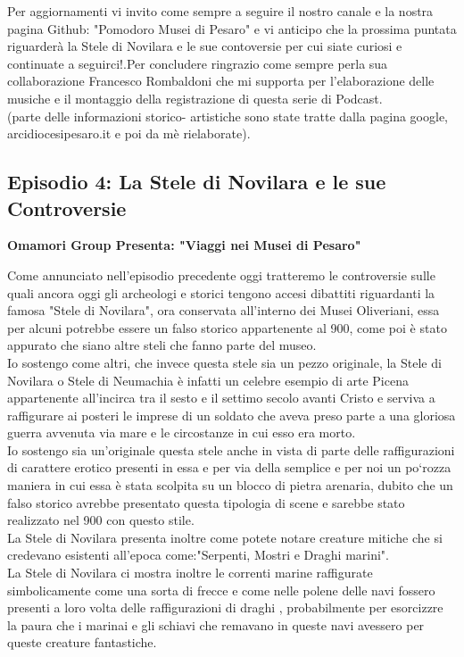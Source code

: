\documentclass[hidelinks,12pt,a4paper]{article}
\begin{document}
\begin{flushleft}
		Per aggiornamenti vi invito come sempre a seguire il nostro canale e la nostra pagina Github: "Pomodoro Musei di Pesaro" e vi anticipo che la prossima puntata riguarderà la Stele di Novilara e le sue contoversie per cui siate curiosi e continuate a seguirci!.Per concludere ringrazio come sempre perla sua collaborazione Francesco Rombaldoni che mi supporta per l'elaborazione delle musiche e il montaggio della registrazione di questa serie di Podcast.\\
		(parte delle informazioni storico- artistiche sono state tratte dalla pagina google, arcidiocesipesaro.it e poi da mè rielaborate).\\
		
		\subsection{Episodio 4: La Stele di Novilara e le sue Controversie}
		\begin{center}
			\textbf{Omamori Group Presenta: "Viaggi nei Musei di Pesaro"}
		\end{center}
		Come annunciato nell'episodio precedente oggi tratteremo le controversie sulle quali ancora oggi gli archeologi e storici tengono accesi dibattiti riguardanti la famosa "Stele di Novilara", ora conservata all'interno dei Musei Oliveriani, essa per alcuni potrebbe essere un falso storico appartenente al 900, come poi è stato appurato che siano altre steli che fanno parte del museo.\\
		Io sostengo come altri, che invece questa stele sia un pezzo originale, la Stele di Novilara o Stele di Neumachia è infatti un celebre esempio di arte Picena appartenente all'incirca tra il sesto e il settimo secolo avanti Cristo e serviva a raffigurare ai posteri le imprese di un soldato che aveva preso parte a una gloriosa guerra avvenuta via mare e le circostanze in cui esso era morto.\\
		Io sostengo sia un'originale questa stele anche in vista di parte delle raffigurazioni di carattere erotico presenti in essa e per via della semplice e per noi un po`rozza maniera in cui essa è stata scolpita su un blocco di pietra arenaria, dubito che un falso storico avrebbe presentato questa tipologia di scene e sarebbe stato realizzato nel 900 con questo stile.\\
		La Stele di Novilara presenta inoltre come potete notare creature mitiche che si credevano esistenti all'epoca come:"Serpenti, Mostri e Draghi marini".\\
		La Stele di Novilara ci mostra inoltre le correnti marine raffigurate simbolicamente come una sorta di frecce e come nelle polene delle navi fossero presenti a loro volta delle raffigurazioni di draghi , probabilmente per esorcizzre la paura che i marinai e gli schiavi che remavano in queste navi avessero per queste creature fantastiche.\\

\end{flushleft}
\end{document}
